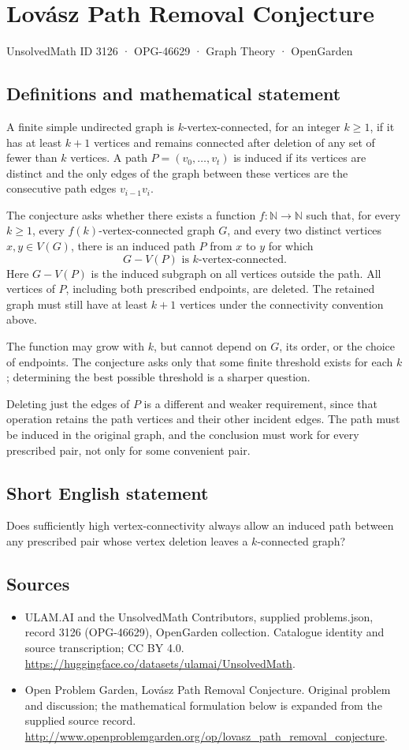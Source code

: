 \documentclass[11pt,a4paper]{article}
\begin{document}
\section*{Lovász Path Removal Conjecture}\label{3126}
{\small UnsolvedMath ID 3126 · OPG-46629 · Graph Theory · OpenGarden}
\subsection{Definitions and mathematical statement}
A finite simple undirected graph is $k$-vertex-connected, for an integer
$k\ge1$, if it has at least $k+1$ vertices and remains connected after
deletion of any set of fewer than $k$ vertices. A path
$P=(v_0,\ldots,v_t)$ is induced if its vertices are distinct and the
only edges of the graph between these vertices are the consecutive
path edges $v_{i-1}v_i$.

The conjecture asks whether there exists a function
$f:\mathbb N\to\mathbb N$ such that, for every $k\ge1$, every
$f(k)$-vertex-connected graph $G$, and every two distinct vertices
$x,y\in V(G)$, there is an induced path $P$ from $x$ to $y$ for which
\[
 G-V(P)\text{ is }k\text{-vertex-connected}.
\]
Here $G-V(P)$ is the induced subgraph on all vertices outside the path.
All vertices of $P$, including both prescribed endpoints, are deleted.
The retained graph must still have at least $k+1$ vertices under the
connectivity convention above.

The function may grow with $k$, but cannot depend on $G$, its order,
or the choice of endpoints. The conjecture asks only that some finite
threshold exists for each $k$; determining the best possible threshold
is a sharper question.

Deleting just the edges of $P$ is a different and weaker requirement,
since that operation retains the path vertices and their other incident
edges. The path must be induced in the original graph, and the conclusion
must work for every prescribed pair, not only for some convenient pair.
\subsection{Short English statement}
Does sufficiently high vertex-connectivity always allow an induced path between any prescribed pair whose vertex deletion leaves a $k$-connected graph?
\subsection{Sources}
\begin{itemize}
\item[S1] ULAM.AI and the UnsolvedMath Contributors, supplied problems.json, record 3126 (OPG-46629), OpenGarden collection. Catalogue identity and source transcription; CC BY 4.0.
\url{https://huggingface.co/datasets/ulamai/UnsolvedMath}.
\item[S2] Open Problem Garden, Lovász Path Removal Conjecture. Original problem and discussion; the mathematical formulation below is expanded from the supplied source record.
\url{http://www.openproblemgarden.org/op/lovasz_path_removal_conjecture}.
\end{itemize}
\end{document}
